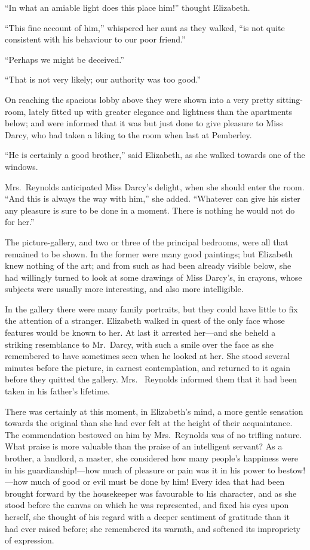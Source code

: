 ``In what an amiable light does this place him!'' thought
Elizabeth.

``This fine account of him,'' whispered her aunt as they walked,
``is not quite consistent with his behaviour to our poor friend.''

``Perhaps we might be deceived.''

``That is not very likely; our authority was too good.''

On reaching the spacious lobby above they were shown into a
very pretty sitting-room, lately fitted up with greater elegance
and lightness than the apartments below; and were informed that
it was but just done to give pleasure to Miss Darcy, who had
taken a liking to the room when last at Pemberley.

``He is certainly a good brother,'' said Elizabeth, as she walked
towards one of the windows.

Mrs.\ Reynolds anticipated Miss Darcy's delight, when she
should enter the room.  ``And this is always the way with him,''
she added.  ``Whatever can give his sister any pleasure is sure
to be done in a moment.  There is nothing he would not do for
her.''

The picture-gallery, and two or three of the principal bedrooms,
were all that remained to be shown.  In the former were many
good paintings; but Elizabeth knew nothing of the art; and from
such as had been already visible below, she had willingly turned
to look at some drawings of Miss Darcy's, in crayons, whose
subjects were usually more interesting, and also more intelligible.

In the gallery there were many family portraits, but they could
have little to fix the attention of a stranger.  Elizabeth walked
in quest of the only face whose features would be known to her.
At last it arrested her---and she beheld a striking resemblance
to Mr.\ Darcy, with such a smile over the face as she remembered
to have sometimes seen when he looked at her.  She stood
several minutes before the picture, in earnest contemplation,
and returned to it again before they quitted the gallery.  Mrs.\ %
Reynolds informed them that it had been taken in his father's
lifetime.

There was certainly at this moment, in Elizabeth's mind, a more
gentle sensation towards the original than she had ever felt at
the height of their acquaintance.  The commendation bestowed
on him by Mrs.\ Reynolds was of no trifling nature.  What praise
is more valuable than the praise of an intelligent servant?  As a
brother, a landlord, a master, she considered how many people's
happiness were in his guardianship!---how much of pleasure or
pain was it in his power to bestow!---how much of good or evil
must be done by him!  Every idea that had been brought forward
by the housekeeper was favourable to his character, and as she
stood before the canvas on which he was represented, and fixed
his eyes upon herself, she thought of his regard with a deeper
sentiment of gratitude than it had ever raised before; she
remembered its warmth, and softened its impropriety of
expression.

